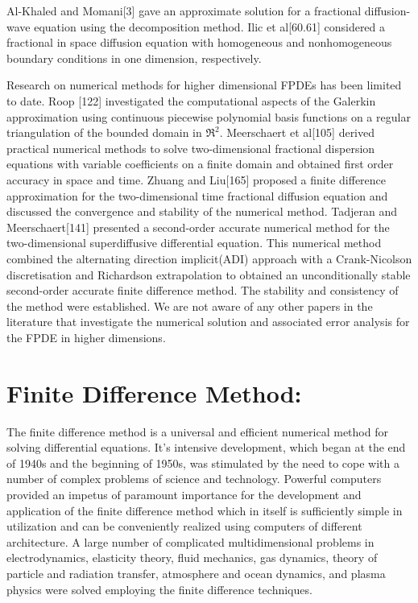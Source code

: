 {Al-Khaled and Momani[3] gave an approximate solution for a fractional diffusion-wave equation using the decomposition method. Ilic et al[60.61] considered a fractional in space diffusion equation with homogeneous and nonhomogeneous boundary conditions in one dimension, respectively.\

Research on numerical methods for higher dimensional FPDEs has been limited to date. Roop [122] investigated the computational aspects of the Galerkin approximation using continuous piecewise polynomial basis functions on a regular triangulation of the bounded domain in $\Re^{2}$. Meerschaert et al[105] derived practical numerical methods to solve two-dimensional fractional dispersion equations with variable coefficients on a finite domain and obtained first order accuracy in space and time. Zhuang and Liu[165] proposed a finite difference approximation for the two-dimensional time fractional diffusion equation and discussed the convergence and stability of the numerical method. Tadjeran and Meerschaert[141] presented a second-order accurate numerical method for the two-dimensional superdiffusive differential equation. This numerical method combined the alternating direction implicit(ADI) approach with a Crank-Nicolson discretisation and Richardson extrapolation to obtained an unconditionally stable second-order accurate finite difference method. The stability and consistency of the method were established. We are not aware of any other papers in the literature that investigate the numerical solution and associated error analysis for the FPDE in higher dimensions.

\section{Finite Difference Method:}
The finite difference method is a universal and efficient numerical method for solving differential equations. It's intensive development, which began at the end of 1940s and  the beginning of 1950s, was stimulated by the need to cope with a number of complex problems of science and technology. Powerful computers provided an impetus of paramount importance for the development and application of the finite difference method which in itself is sufficiently simple in utilization and can be conveniently realized using computers of different architecture. A large number of complicated multidimensional problems in electrodynamics, elasticity theory, fluid mechanics, gas dynamics, theory of particle and radiation transfer, atmosphere and ocean dynamics, and plasma physics were solved employing the finite difference techniques.\

}
